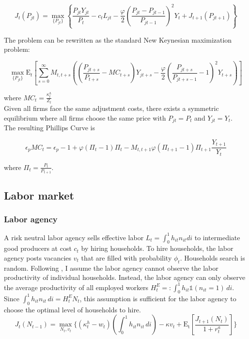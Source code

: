 $$J_{t}\left(P_{jt}\right) = \max_{\{P_{jt}\}} \left\{\frac{P_{jt}Y_{jt}}{P_{t}} - c_{t} L_{jt} -  \frac{\varphi}{2}\left( \frac{P_{jt} - P_{jt-1}}{P_{jt-1}} \right)^{2} Y_{t}  + J_{t+1}\left(P_{jt+1}\right) \right\}$$ 

The problem can be rewritten as the standard New Keynesian maximization problem:

$$\max_{\{P_{jt}\}} \mathrm{E}_{t}\left[\sum_{s=0}^{\infty}  M_{t,t+s} \left( \left( \frac{P_{jt+s}}{P_{t+s}} - MC_{t+s}\right)Y_{jt+s} -  \frac{\varphi}{2}\left( \frac{P_{jt+s}}{P_{jt+s-1}} - 1\right)^{2} Y_{t+s} \right)\right]$$ 


where $MC_{t} = \frac{\kappa^{h}_{t}}{Z_{t}}  $ \\



Given all firms face the same adjustment costs, there exists a symmetric equilibrium where all firms choose the same price with $P_{jt} =P_{t}$ and $Y_{jt} =Y_{t}$.\\ 

The resulting Phillips Curve is


$$ \epsilon_{p} MC_{t} = \epsilon_{p} - 1 + \varphi ( \Pi_{t} -1) \Pi_{t} - M_{t,t+1} \varphi (\Pi_{t+1} -1 ) \Pi_{t+1} \frac{Y_{t+1}}{Y_{t}}$$

where $ \Pi_{t} = \frac{P_{t}}{P_{t+1}}$. \\



\hypertarget{Labor market}{}
\subsection{Labor market}

\hypertarget{Labor agency}{}
\subsubsection{Labor agency}

A risk neutral labor agency sells effective labor $L_{t}= \int_{0}^{1} h_{it}n_{it} di $ to intermediate good producers at cost $c_{t}$ by hiring households. To hire households, the labor agency posts vacancies $v_{t}$ that are filled with probability $\phi_{t}$.  Households search is random. Following \cite{Bardoczy2020}, I assume the labor agency cannot observe the labor productivity of individual households. Instead, the labor agency can only observe the average productivity of all employed workers  $H^{E}_{t} =: \int_{0}^{1} h_{it}\mathbb{1}(n_{it} =1)  \, di$. Since $\int_{0}^{1} h_{it}n_{it} \, di = H^{E}_{t} N_{t} $, this assumption is sufficient for the labor agency to choose the optimal level of households to hire. 
$$J_{t}(N_{t-1})  = \max_{N_{t},v_{t}} \{( \kappa^{h}_{t} - w_{t}) \left(\int_{0}^{1} h_{it}n_{it} \, di  \right)- \kappa v_{t} + \mathrm{E_{t}}\left[ \frac{J_{t+1}(N_{t})}{1 + r^{a}_{t}}\right]\}$$

